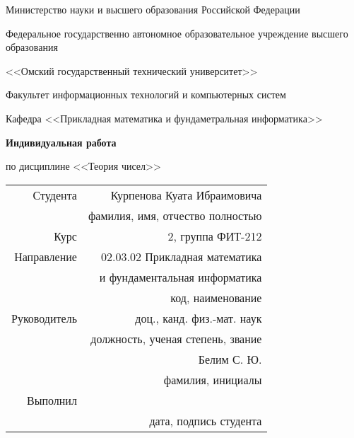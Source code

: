 \documentclass[14pt, a4paper]{article}
\begin{document}
    \thispagestyle{empty}

    \begin{center}
        Министерство науки и высшего образования Российской Федерации

        Федеральное государственно автономное образовательное учреждение высшего образования

        <<Омский государственный технический университет>>

        \vspace{1cm}
        Факультет информационных технологий и компьютерных систем

        Кафедра <<Прикладная математика и фундаметральная информатика>>

        \vspace{3cm}
        \textbf{Индивидуальная работа}

        по дисциплине <<Теория чисел>>
    \end{center}
    
    \vspace{3cm}
    \begin{flushright}    
        \begin{tabular}{ r r }
            Студента & Курпенова Куата Ибраимовича \\
            \cline{2-2}
            & \tiny{фамилия, имя, отчество полностью} \\

            Курс & 2, группа ФИТ-212 \\
            \cline{2-2}
            Направление & 02.03.02 Прикладная математика \\
            \cline{2-2}
            & и фундаментальная информатика \\
            \cline{2-2}
            & \tiny{код, наименование} \\
            
            Руководитель & доц., канд. физ.-мат. наук \\
            \cline{2-2}
            & \tiny{должность, ученая степень, звание} \\
            & Белим С. Ю. \\
            \cline{2-2}
            & \tiny{фамилия, инициалы} \\
            
            Выполнил & \\
            \cline{2-2}
            & \tiny{дата, подпись студента} \\
            
        \end{tabular}
    \end{flushright}
    
\end{document}
